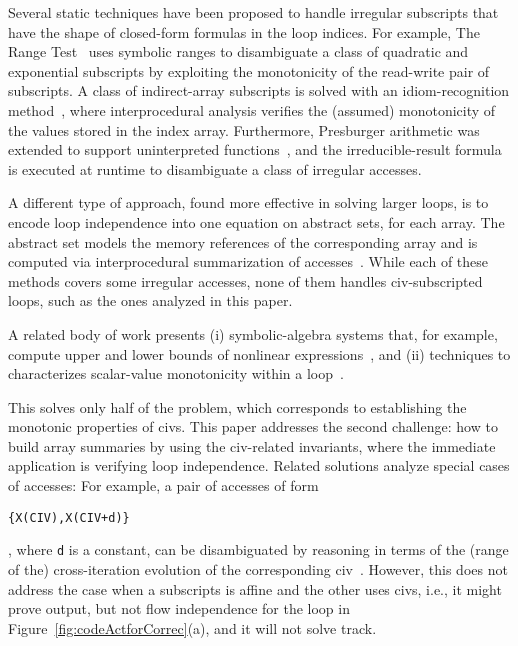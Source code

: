 \documentclass[10pt,nocopyrightspace]{sigplanconf}
\begin{document}
Several static techniques have been proposed to handle irregular subscripts that have
the shape of closed-form formulas in the loop indices. For example, 
The Range Test~\cite{Blume94RangeTest} uses symbolic 
ranges to disambiguate a class of quadratic and  
exponential subscripts by exploiting the monotonicity of the read-write pair 
of subscripts.   A class of indirect-array subscripts is solved with 
an idiom-recognition method~\cite{PaduaDemDrInterproc}, where interprocedural 
analysis verifies the (assumed) monotonicity of the values stored in the 
index array.
%
Furthermore, Presburger arithmetic was extended to support
uninterpreted functions~\cite{Pugh98NonlinPresb}, and the irreducible-result
formula is executed at runtime to disambiguate a class of irregular
accesses. 

A different type of approach, found more effective in
solving larger loops, is to encode loop independence into one equation 
on abstract sets, for each array. The abstract set models the
memory references of the corresponding array and is computed 
via interprocedural summarization of 
accesses~\cite{SUIF,Moon99PredArrDataFlow,SummaryMonot,LMAD}.
While each of these methods covers some irregular accesses,
none of them handles {\sc civ}-subscripted loops,   
such as the ones analyzed in this paper.
%

\enlargethispage{\baselineskip}

A related  body of work presents (i) symbolic-algebra systems that, for example,  
compute upper and lower bounds of nonlinear expressions~\cite{Fahringer97EffSymb},
and (ii) techniques to characterizes scalar-value monotonicity within a 
loop~\cite{VEG,MonStmt}.

This solves only half of the problem, which   
corresponds to establishing the monotonic properties of {\sc civ}s.
This paper addresses the second challenge: 
how to build array summaries by using the {\sc civ}-related invariants,
where the immediate application is verifying loop independence. 
Related solutions analyze special cases of accesses:
%
For example, a pair of accesses of form  
\begin{small}{\tt\{X(CIV),X(CIV+d)\}}\end{small}, where {\tt d} is a constant,
can be disambiguated by reasoning in terms of the (range of the) cross-iteration 
evolution of the corresponding {\sc civ}~\cite{CohenBeyondMon}.
%
However, this does not address the case when a subscripts is affine
and the other uses {\sc civ}s, i.e., it might prove output, but not 
flow independence for the loop in Figure~\ref{fig:codeActforCorrec}(a), 
and it will not solve {\sc track}. 
\end{document}
